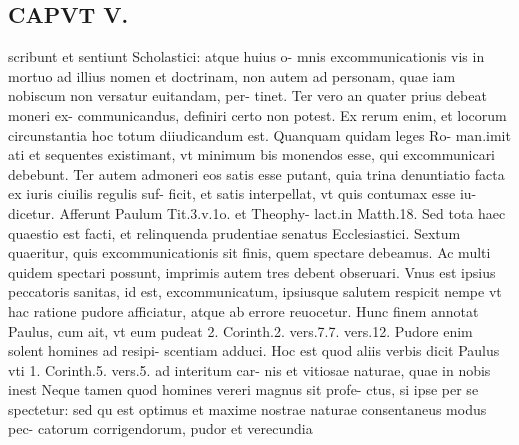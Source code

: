 \documentclass{article}
\begin{document}
\begin{pages}
\section*{CAPVT  V. }
\marginpar{[ p.399 ]}\pstart scribunt et sentiunt Scholastici: atque huius o- mnis excommunicationis vis in mortuo ad illius nomen et doctrinam, non autem ad personam, quae iam nobiscum non versatur euitandam, per- tinet. Ter vero an quater prius debeat moneri ex- communicandus, definiri certo non potest. Ex rerum enim, et locorum circunstantia hoc totum diiudicandum est. Quanquam quidam leges Ro- man.imit ati et sequentes existimant, vt minimum bis monendos esse, qui excommunicari debebunt. Ter autem admoneri eos satis esse putant, quia trina denuntiatio facta ex iuris ciuilis regulis suf- ficit, et satis interpellat, vt quis contumax esse iu- dicetur. Afferunt Paulum Tit.3.v.1o. et Theophy- lact.in Matth.18. Sed tota haec quaestio est facti, et relinquenda prudentiae senatus Ecclesiastici. Sextum quaeritur, quis excommunicationis sit finis, quem spectare debeamus. Ac multi quidem spectari possunt, imprimis autem tres debent obseruari. Vnus est ipsius peccatoris sanitas, id est, excommunicatum, ipsiusque salutem respicit nempe vt hac ratione pudore afficiatur, atque ab errore reuocetur. Hunc finem annotat Paulus, cum ait, vt eum pudeat 2. Corinth.2. vers.7.7. vers.12. Pudore enim solent homines ad resipi- scentiam adduci. Hoc est quod aliis verbis dicit Paulus vti 1. Corinth.5. vers.5. ad interitum car- nis et vitiosae naturae, quae in nobis inest Neque tamen quod homines vereri magnus sit profe- ctus, si ipse per se spectetur: sed qu est optimus et maxime nostrae naturae consentaneus modus pec- catorum corrigendorum, pudor et verecundia  \pend

\end{pages}
\end{document}
